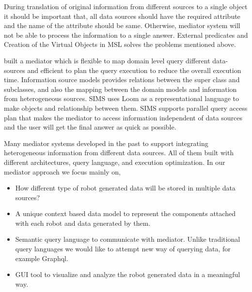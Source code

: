 	During translation of original information from different sources to a single object it should be important that, all data sources should have the required attribute and the name of the attribute should be same. Otherwise, mediator system will not be able to process the information to a single answer.  External predicates and Creation of the Virtual Objects in MSL solves the problems mentioned above.
	
	\citet{arens1996query} built a mediator which is flexible to map domain level query different data-sources and efficient to plan the query execution to reduce the overall execution time. Information source models provides relations between the super class and subclasses, and also the mapping between the domain models and information from heterogeneous sources. SIMS uses Loom as a representational language to make objects and relationship between them. SIMS supports parallel query access plan that makes the mediator to access information independent of data sources and the user will get the final answer as quick as possible.
	
	Many mediator systems developed in the past to support integrating heterogeneous information from different data sources. All of them built with different architectures, query language, and execution optimization. In our mediator approach we focus mainly on,
	\begin{itemize}
		\item How different type of robot generated data will be stored in multiple data sources?
		\item A unique context based data model to represent the components attached with each robot and data generated by them.
		\item Semantic query language to communicate with mediator. Unlike traditional query languages we would like to attempt new way of querying data, for example Graphql.
		\item GUI tool to visualize and analyze the robot generated data in a meaningful way.
	\end{itemize} 


